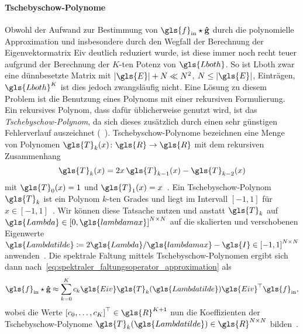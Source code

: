 \paragraph{Tschebyschow-Polynome}
\label{tschebyschow_polynome}

Obwohl der Aufwand zur Bestimmung von $\gls{f}_{\mathrm{in}} \star \ve{\hat g}$ durch die polynomielle Approximation und insbesondere durch den Wegfall der Berechnung der Eigenvektormatrix \gls{Eiv} deutlich reduziert wurde, ist diese immer noch recht teuer aufgrund der Berechnung der $K$-ten Potenz von $\gls{Lboth}$.
So ist \gls{Lboth} zwar eine dünnbesetzte Matrix mit $\left|\gls{E}\right| + N \ll N^2$, $N \leq \left|\gls{E}\right|$, Einträgen, $\gls{Lboth}^K$ ist dies jedoch zwangsläufig nicht.
Eine Lösung zu diesem Problem ist die Benutzung eines Polynoms mit einer rekursiven Formulierung.
Ein rekursives Polynom, dass dafür üblicherweise genutzt wird, ist das \emph{Tschebyschow-Polynom}, da sich dieses zusätzlich durch einen sehr günstigen Fehlerverlauf auszeichnet (\vgl{}~\cite{Hammond}).
Tschebyschow-Polynome bezeichnen eine Menge von Polynomen $\gls{T}_k\left(x\right) \colon \gls{R} \to \gls{R}$ mit dem rekursiven Zusammenhang
\begin{equation*}
  \gls{T}_k\left(x\right) = 2x\, \gls{T}_{k-1}\left(x\right) - \gls{T}_{k-2}\left(x\right)
\end{equation*}
mit $\gls{T}_0\left(x\right) = 1$ und $\gls{T}_1\left(x\right) = x$~\cite{Hammond}.
Ein Tschebyschow-Polynom $\gls{T}_k$ ist ein Polynom $k$-ten Grades und liegt im Intervall $\left[-1, 1\right]$ für $x \in \left[-1, 1\right]$~\cite{Hammond}.
Wir können diese Tatsache nutzen und anstatt $\gls{T}_k$ auf $\gls{Lambda} \in {\left[0, \gls{lambdamax}\right]}^{N \times N}$ auf die skalierten und verschobenen Eigenwerte $\gls{Lambdatilde} \coloneqq 2\gls{Lambda}/\gls{lambdamax} - \gls{I} \in {\left[-1, 1\right]}^{N \times N}$ anwenden~\cite{Defferrard}.
Die spektrale Faltung mittels Tschebyschow-Polynomen ergibt sich dann nach~\eqref{eq:spektraler_faltungsoperator_approximation} als
\begin{equation}
  \gls{f}_{\mathrm{in}} \star \ve{\hat g} \approx \sum_{k=0}^K c_k\gls{Eiv}\gls{T}_k\left(\gls{Lambdatilde}\right)\gls{Eiv}^{\top}\gls{f}_{\mathrm{in}},
  \label{eq:tschebyschow_faltung}
\end{equation}
wobei die Werte ${\left[c_0, \ldots, c_K\right]}^{\top} \in \gls{R}^{K+1}$ nun die Koeffizienten der Tschebyschow-Po\-ly\-no\-me $\gls{T}_k\left(\gls{Lambdatilde}\right) \in \gls{R}^{N \times N}$ bilden~\cite{Defferrard}.
